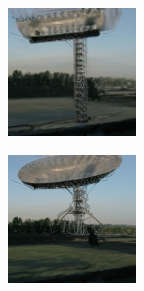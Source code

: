 \documentclass{article}
\begin{document}
\begin{figure}
\begin{subfigure}[b]{0.5\linewidth}
\begin{subfigure}[b]{0.242\linewidth}
        \end{subfigure}%
        \begin{subfigure}[b]{0.242\linewidth}
        \includegraphics[width=\linewidth]{figures/imagenet128/solver_samples/imagenet128_fm_ot_50_20.png}
        \end{subfigure}%
        \begin{subfigure}[b]{0.242\linewidth}
        \includegraphics[width=\linewidth]{figures/imagenet128/solver_samples/imagenet128_fm_ot_50_50.png}

\end{subfigure}
\end{subfigure}
\end{figure}
\end{document}
